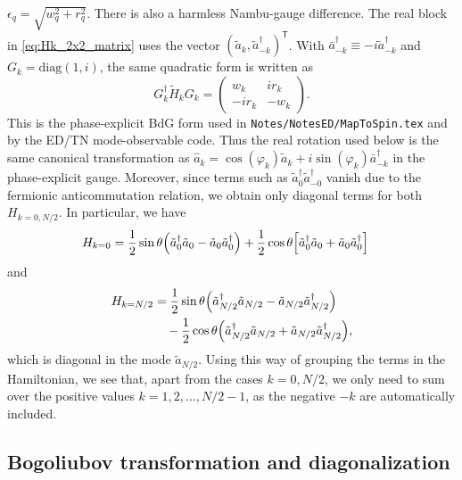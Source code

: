 $\epsilon_q=\sqrt{w_q^2+r_q^2}$.
There is also a harmless Nambu-gauge difference. The real block in
\cref{eq:Hk_2x2_matrix} uses the vector
$(\tilde{a}_k,\tilde{a}_{-k}^\dagger)^\mathsf{T}$. With
$\bar{a}_{-k}^\dagger\equiv -i\tilde{a}_{-k}^\dagger$ and
$G_k=\mathrm{diag}(1,i)$, the same quadratic form is written as
\begin{equation}
    G_k^\dagger \tilde{H}_k G_k =
    \begin{pmatrix}
        w_k   & i r_k\\
        -i r_k& -w_k
    \end{pmatrix}.
    \label{eq:bdg_gauge_map}
\end{equation}
This is the phase-explicit BdG form used in
\texttt{Notes/NotesED/MapToSpin.tex} and by the ED/TN mode-observable code.
Thus the real rotation used below is the same canonical transformation as
$\hat{a}_k=\cos(\varphi_k)\tilde{a}_k
+i\sin(\varphi_k)\bar{a}_{-k}^\dagger$ in the phase-explicit gauge.
Moreover, since terms such as $\tilde{a}_0^\dagger \tilde{a}_{-0}^\dagger$ vanish due to the fermionic anticommutation relation, we obtain only diagonal terms for both $H_{k=0,N/2}$. In particular, we have
\begin{align}
    H_{k=0}
     &=
    \frac{1}{2} \sin\theta
    \Bigl(\tilde{a}_0^\dagger \tilde{a}_0
    -
    \tilde{a}_0 \tilde{a}_0^\dagger
    \Bigr) +
    \frac{1}{2} \cos\theta
    \Bigl[
        \tilde{a}_0^\dagger \tilde{a}_0
        +
        \tilde{a}_0 \tilde{a}_0^\dagger
        \Bigr]
\end{align}
and
\begin{align}
    H_{k=N/2}
     &=
    \frac{1}{2} \sin\theta
    \Bigl(\tilde{a}_{N/2}^\dagger \tilde{a}_{N/2}
    -
    \tilde{a}_{N/2} \tilde{a}_{N/2}^\dagger
    \Bigr)\nonumber\\
     &\quad
    - \frac{1}{2} \cos\theta
    \Bigl(\tilde{a}_{N/2}^\dagger \tilde{a}_{N/2} +
    \tilde{a}_{N/2} \tilde{a}_{N/2}^\dagger
    \Bigr),
\end{align}
which is diagonal in the mode $\tilde{a}_{N/2}$. Using this way of grouping the terms in the Hamiltonian, we see that, apart from the cases $k=0,N/2$, we only need to sum over the positive values $k=1,2,\ldots,N/2-1$, as the negative $-k$ are automatically included.

\subsection{Bogoliubov transformation and diagonalization}

